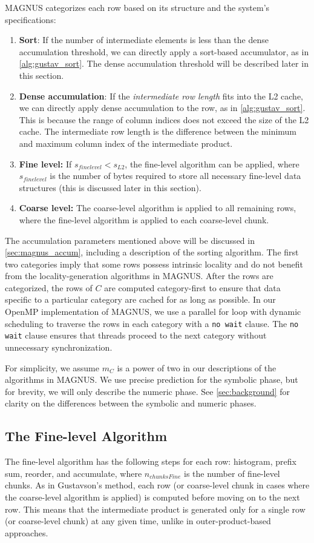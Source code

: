 MAGNUS categorizes each row based on its structure and the system's specifications:
\begin{enumerate}
    \item \textbf{Sort}: If the number of intermediate elements is less than the dense accumulation threshold, we can directly apply a sort-based accumulator, as in \autoref{alg:gustav_sort}.  The dense accumulation threshold will be described later in this section.
    \item \textbf{Dense accumulation}: If the \emph{intermediate row length} fits into the L2 cache, we can directly apply dense accumulation to the row, as in \autoref{alg:gustav_sort}.  This is because the range of column indices does not exceed the size of the L2 cache.   The intermediate row length is the difference between the minimum and maximum column index of the intermediate product.
    \item \textbf{Fine level:} If $s_{finelevel} < s_{L2}$, the fine-level algorithm can be applied, where $s_{finelevel}$ is the number of bytes required to store all necessary fine-level data structures (this is discussed later in this section).
    \item \textbf{Coarse level:} The coarse-level algorithm is applied to all remaining rows, where the fine-level algorithm is applied to each coarse-level chunk.
\end{enumerate}
The accumulation parameters mentioned above will be discussed in \autoref{sec:magnus_accum}, including a description of the sorting algorithm.
The first two categories imply that some rows possess intrinsic locality and do not benefit from the locality-generation algorithms in MAGNUS.
After the rows are categorized, the rows of $C$ are computed category-first to ensure that data specific to a particular category are cached for as long as possible.
In our OpenMP implementation of MAGNUS, we use a parallel for loop with dynamic scheduling to traverse the rows in each category with a \texttt{no wait} clause.
The \texttt{no wait} clause ensures that threads proceed to the next category without unnecessary synchronization.

For simplicity, we assume $m_C$ is a power of two in our descriptions of the algorithms in MAGNUS.
We use precise prediction for the symbolic phase, but for brevity, we will only describe the numeric phase.
See \autoref{sec:background} for clarity on the differences between the symbolic and numeric phases.

\subsection{The Fine-level Algorithm}\label{sec:magnus_fineLevel}
The fine-level algorithm has the following steps for each row: histogram, prefix sum, reorder, and accumulate, where $n_{chunksFine}$ is the number of fine-level chunks.
As in Gustavson's method, each row (or coarse-level chunk in cases where the coarse-level algorithm is applied) is computed before moving on to the next row.
This means that the intermediate product is generated only for a single row (or coarse-level chunk) at any given time, unlike
in outer-product-based approaches.

